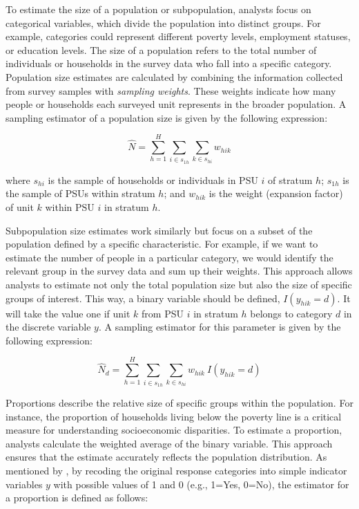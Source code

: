 \documentclass[
  12pt,
]{book}
\begin{document}
To estimate the size of a population or subpopulation, analysts focus on categorical variables, which divide the population into distinct groups. For example, categories could represent different poverty levels, employment statuses, or education levels. The size of a population refers to the total number of individuals or households in the survey data who fall into a specific category. Population size estimates are calculated by combining the information collected from survey samples with \emph{sampling weights}. These weights indicate how many people or households each surveyed unit represents in the broader population. A sampling estimator of a population size is given by the following expression:

\[
\widehat{N} = \sum_{h=1}^{H} \sum_{i \in s_{1h}} \sum_{k \in s_{hi}} w_{hik}
\]

where \(s_{hi}\) is the sample of households or individuals in PSU \(i\) of stratum \(h\); \(s_{1h}\) is the sample of PSUs within stratum \(h\); and \(w_{hik}\) is the weight (expansion factor) of unit \(k\) within PSU \(i\) in stratum \(h\).

Subpopulation size estimates work similarly but focus on a subset of the population defined by a specific characteristic. For example, if we want to estimate the number of people in a particular category, we would identify the relevant group in the survey data and sum up their weights. This approach allows analysts to estimate not only the total population size but also the size of specific groups of interest. This way, a binary variable should be defined, \(I(y_{hik} = d)\). It will take the value one if unit \(k\) from PSU \(i\) in stratum \(h\) belongs to category \(d\) in the discrete variable \(y\). A sampling estimator for this parameter is given by the following expression:

\[
{\widehat{N}}_d = \sum_{h=1}^{H}\sum_{i \in s_{1h}} \sum_{ k \in s_{hi}} w_{hik} \ I(y_{hik} = d)
\]

Proportions describe the relative size of specific groups within the population. For instance, the proportion of households living below the poverty line is a critical measure for understanding socioeconomic disparities. To estimate a proportion, analysts calculate the weighted average of the binary variable. This approach ensures that the estimate accurately reflects the population distribution. As mentioned by \citet{Heeringa2017}, by recoding the original response categories into simple indicator variables \(y\) with possible values of 1 and 0 (e.g., 1=Yes, 0=No), the estimator for a proportion is defined as follows:
\end{document}

